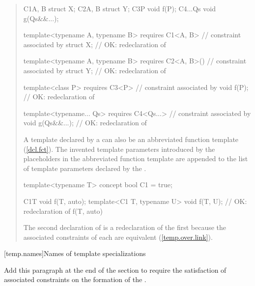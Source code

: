 \begin{quote}
\begin{codeblock}
C1{A, B} struct X;
C2{A, B} struct Y;
C3{P} void f(P);
C4{...Qs} void g(Qs&&...);

template<typename A, typename B> 
  requires C1<A, B> // constraint associated by 
    struct X;       // OK: redeclaration of 

template<typename A, typename B> 
  requires C2<A, B>()  // constraint associated by 
    struct Y;          // OK: redeclaration of 

template<class P>
  requires C3<P> // constraint associated by 
    void f(P);   // OK: redeclaration of 

template<typename... Qs>
  requires C4<Qs...> // constraint associated by 
    void g(Qs&&...); // OK: redeclaration of 
\end{codeblock}
\exitexample


\pnum
A template declared by a  can also be 
an abbreviated function template (\ref{dcl.fct}). 
% 
The invented template parameters introduced by the placeholders in the 
abbreviated function template are appended to the list of template parameters 
declared by the .
% 
\enterexample
\begin{codeblock}
template<typename T> concept bool C1 = true;

C1{T} void f(T, auto);
template<C1 T, typename U> void f(T, U); // OK: redeclaration of f(T, auto)
\end{codeblock}
% 
\enternote
The second declaration of  is a redeclaration of the first
because the associated constraints of each are equivalent 
(\ref{temp.over.link}).
\exitnote
\exitexample

\end{quote}

[temp.names]{Names of template specializations}

Add this paragraph at the end of the section to require the satisfaction of 
associated constraints on the formation of the .

